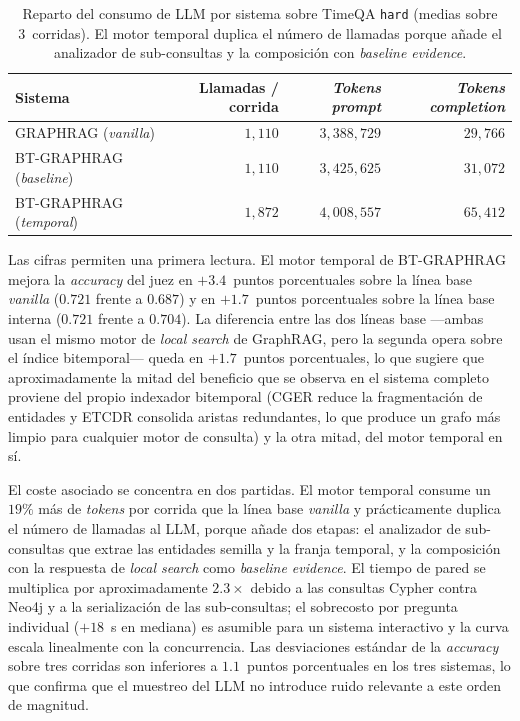\begin{table}[h]
\centering
\small
\begin{tabular}{lrrr}
\hline
\textbf{Sistema} & \textbf{Llamadas / corrida} & \textbf{\emph{Tokens prompt}} & \textbf{\emph{Tokens completion}} \\ \hline
GRAPHRAG (\emph{vanilla})       & $1{,}110$ & $3{,}388{,}729$ & $29{,}766$ \\
BT-GRAPHRAG (\emph{baseline})   & $1{,}110$ & $3{,}425{,}625$ & $31{,}072$ \\
BT-GRAPHRAG (\emph{temporal})   & $1{,}872$ & $4{,}008{,}557$ & $65{,}412$ \\ \hline
\end{tabular}
\caption{Reparto del consumo de LLM por sistema sobre TimeQA \texttt{hard} (medias sobre 3~corridas). El motor temporal duplica el número de llamadas porque añade el analizador de sub-consultas y la composición con \emph{baseline evidence}.}
\label{tab:eval-timeqa-calls}
\end{table}

Las cifras permiten una primera lectura. El motor temporal de BT-GRAPHRAG mejora la \emph{accuracy} del juez en $+3.4$~puntos porcentuales sobre la línea base \emph{vanilla} ($0.721$ frente a $0.687$) y en $+1.7$~puntos porcentuales sobre la línea base interna ($0.721$ frente a $0.704$). La diferencia entre las dos líneas base ---ambas usan el mismo motor de \emph{local search} de GraphRAG, pero la segunda opera sobre el índice bitemporal--- queda en $+1.7$~puntos porcentuales, lo que sugiere que aproximadamente la mitad del beneficio que se observa en el sistema completo proviene del propio indexador bitemporal (CGER reduce la fragmentación de entidades y ETCDR consolida aristas redundantes, lo que produce un grafo más limpio para cualquier motor de consulta) y la otra mitad, del motor temporal en sí.

El coste asociado se concentra en dos partidas. El motor temporal consume un $19\%$ más de \emph{tokens} por corrida que la línea base \emph{vanilla} y prácticamente duplica el número de llamadas al LLM, porque añade dos etapas: el analizador de sub-consultas que extrae las entidades semilla y la franja temporal, y la composición con la respuesta de \emph{local search} como \emph{baseline evidence}. El tiempo de pared se multiplica por aproximadamente $2.3\times$ debido a las consultas Cypher contra Neo4j y a la serialización de las sub-consultas; el sobrecosto por pregunta individual ($+18$~s en mediana) es asumible para un sistema interactivo y la curva escala linealmente con la concurrencia. Las desviaciones estándar de la \emph{accuracy} sobre tres corridas son inferiores a $1.1$~puntos porcentuales en los tres sistemas, lo que confirma que el muestreo del LLM no introduce ruido relevante a este orden de magnitud.

